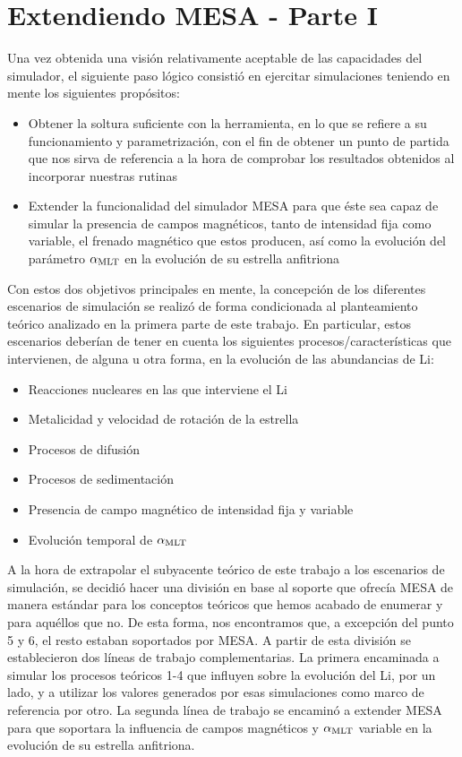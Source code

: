 \section{Extendiendo MESA - Parte I} \label{mesa_parte1}
Una vez obtenida una visión relativamente aceptable de las capacidades del simulador, el siguiente paso lógico consistió en ejercitar simulaciones teniendo en mente los siguientes propósitos:

\begin{itemize}
    \item Obtener la soltura suficiente con la herramienta, en lo que se refiere a su funcionamiento y parametrización, con el fin de obtener un punto de partida que nos sirva de referencia a la hora de comprobar los resultados obtenidos al incorporar nuestras rutinas
    \item Extender la funcionalidad del simulador MESA para que éste sea capaz de simular la presencia de campos magnéticos, tanto de intensidad fija como variable, el frenado magnético que estos producen, así como la evolución del parámetro $\alpha_{\mathrm{MLT}}$ en la evolución de su estrella anfitriona
\end{itemize}

Con estos dos objetivos principales en mente, la concepción de los diferentes escenarios de simulación se realizó de forma condicionada al planteamiento teórico analizado en la primera parte de este trabajo. En particular, estos escenarios deberían de tener en cuenta los siguientes procesos/características que intervienen, de alguna u otra forma, en la evolución de las abundancias de Li:

\begin{itemize}
    \item Reacciones nucleares en las que interviene el Li
    \item Metalicidad y velocidad de rotación de la estrella
    \item Procesos de difusión
    \item Procesos de sedimentación
    \item Presencia de campo magnético de intensidad fija y variable
    \item Evolución temporal de $\alpha_{\mathrm{MLT}}$
\end{itemize}

A la hora de extrapolar el subyacente teórico de este trabajo a los escenarios de simulación, se decidió hacer una división en base al soporte que ofrecía MESA de manera estándar para los conceptos teóricos que hemos acabado de enumerar y para aquéllos que no. De esta forma, nos encontramos que, a excepción del punto 5 y 6, el resto estaban soportados por MESA. A partir de esta división se establecieron dos líneas de trabajo complementarias. La primera encaminada a simular los procesos teóricos 1-4 que influyen sobre la evolución del Li, por un lado, y a utilizar los valores generados por esas simulaciones como marco de referencia por otro. La segunda línea de trabajo se encaminó a extender MESA para que soportara la influencia de campos magnéticos y $\alpha_{\mathrm{MLT}}$ variable en la evolución de su estrella anfitriona.\par

